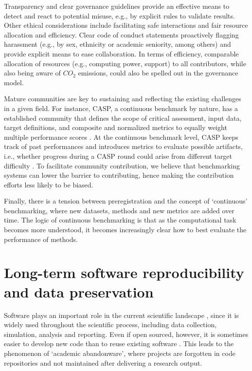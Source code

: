 \documentclass[11pt]{article}
\begin{document}
Transparency and clear governance guidelines provide an effective means to detect and react to potential misuse, e.g., by explicit rules to validate results. Other ethical considerations include facilitating safe interactions and fair resource allocation and efficiency. Clear code of conduct statements proactively flagging harassment (e.g., by sex, ethnicity or academic seniority, among others) and provide explicit means to ease collaboration. In terms of efficiency, comparable allocation of resources (e.g., computing power, support) to all contributors, while also being aware of $CO_2$ emissions, could also be spelled out in the governance model.

Mature communities are key to sustaining and reflecting the existing challenges in a given field. For instance, CASP, a continuous benchmark by nature, has a established community that defines the scope of critical assessment, input data, target definitions, and composite and normalized metrics to equally weight multiple performance scores \cite{simpkin2023tertiary}. At the continuous benchmark level, CASP keeps track of past performances and introduces metrics to evaluate possible artifacts, i.e., whether progress during a CASP round could arise from different target difficulty \cite{kryshtafovych2019critical}. To facilitate community contribution, we believe that benchmarking systems can lower the barrier to contributing, hence making the contribution efforts less likely to be biased. 


Finally, there is a tension between preregistration and the concept of `continuous' benchmarking, where new datasets, methods and new metrics are added over time. The logic of continuous benchmarking is that as the computational task becomes more understood, it becomes increasingly clear how to best evaluate the performance of methods. 

\section*{Long-term software reproducibility and data preservation}

Software plays an important role in the current scientific landscape \cite{Howison2015-rc}, since it is widely used throughout the scientific process, including data collection, simulation, analysis and reporting. Even if open sourced, however, it is sometimes easier to develop new code than to reuse existing software \cite{Trisovic2022-ol}. This leads to the phenomenon of `academic abandonware', where projects are forgotten in code repositories and not maintained after delivering a research output.
\end{document}
